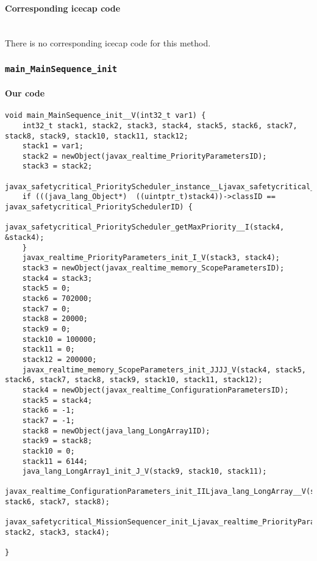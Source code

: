 \paragraph{Corresponding icecap code}\hfill\\
There is no corresponding icecap code for this method.

\subsubsection{\texttt{main\_MainSequence\_init}}

\paragraph{Our code}\hfill
\begin{lstlisting}[firstnumber=1271]
void main_MainSequence_init__V(int32_t var1) {
	int32_t stack1, stack2, stack3, stack4, stack5, stack6, stack7, stack8, stack9, stack10, stack11, stack12;
	stack1 = var1;
	stack2 = newObject(javax_realtime_PriorityParametersID);
	stack3 = stack2;
	javax_safetycritical_PriorityScheduler_instance__Ljavax_safetycritical_PriorityScheduler_(&stack4);
	if (((java_lang_Object*)  ((uintptr_t)stack4))->classID == javax_safetycritical_PrioritySchedulerID) {
		javax_safetycritical_PriorityScheduler_getMaxPriority__I(stack4, &stack4);
	}
	javax_realtime_PriorityParameters_init_I_V(stack3, stack4);
	stack3 = newObject(javax_realtime_memory_ScopeParametersID);
	stack4 = stack3;
	stack5 = 0;
	stack6 = 702000;
	stack7 = 0;
	stack8 = 20000;
	stack9 = 0;
	stack10 = 100000;
	stack11 = 0;
	stack12 = 200000;
	javax_realtime_memory_ScopeParameters_init_JJJJ_V(stack4, stack5, stack6, stack7, stack8, stack9, stack10, stack11, stack12);
	stack4 = newObject(javax_realtime_ConfigurationParametersID);
	stack5 = stack4;
	stack6 = -1;
	stack7 = -1;
	stack8 = newObject(java_lang_LongArray1ID);
	stack9 = stack8;
	stack10 = 0;
	stack11 = 6144;
	java_lang_LongArray1_init_J_V(stack9, stack10, stack11);
	javax_realtime_ConfigurationParameters_init_IILjava_lang_LongArray__V(stack5, stack6, stack7, stack8);
	javax_safetycritical_MissionSequencer_init_Ljavax_realtime_PriorityParameters_Ljavax_realtime_memory_ScopeParameters_Ljavax_realtime_ConfigurationParameters__V(stack1, stack2, stack3, stack4);

}
\end{lstlisting}

